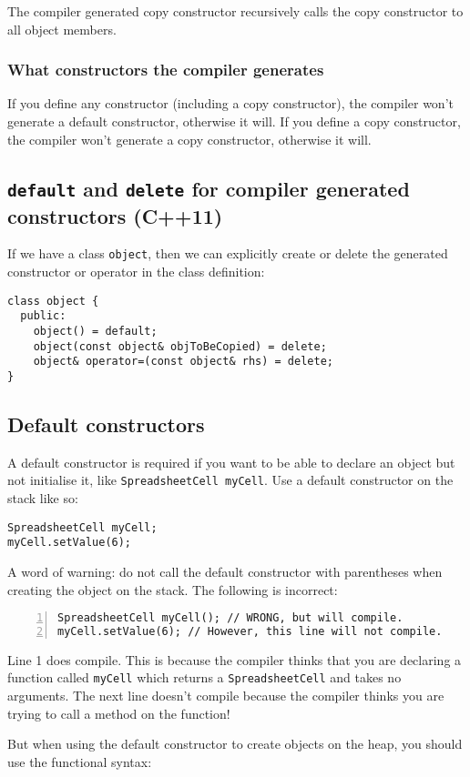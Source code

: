 \documentclass[a4paper,12pt,oneside]{book}
\begin{document}
The compiler generated copy constructor recursively calls the copy constructor to all object members.
\subsubsection{What constructors the compiler generates}
If you define any constructor (including a copy constructor), the compiler won't generate a default constructor, otherwise it will. If you define a copy constructor, the compiler won't generate a copy constructor, otherwise it will.
\subsection{\texttt{default} and \texttt{delete} for compiler generated constructors (C++11)}
If we have a class \lstinline|object|, then we can explicitly create or delete the generated constructor or operator in the class definition:

\begin{lstlisting}
class object {
  public:
    object() = default;
    object(const object& objToBeCopied) = delete;
    object& operator=(const object& rhs) = delete;
}
\end{lstlisting}

\subsection{Default constructors}
A default constructor is required if you want to be able to declare an object but not initialise it, like \lstinline|SpreadsheetCell myCell|. Use a default constructor on the stack like so:

\begin{lstlisting}
SpreadsheetCell myCell;
myCell.setValue(6);
\end{lstlisting}

A word of warning: do not call the default constructor with parentheses when creating the object on the stack. The following is incorrect:

\begin{lstlisting}[numbers=left]
SpreadsheetCell myCell(); // WRONG, but will compile.
myCell.setValue(6); // However, this line will not compile.
\end{lstlisting}

Line 1 does compile. This is because the compiler thinks that you are declaring a function called \lstinline|myCell| which returns a \lstinline|SpreadsheetCell| and takes no arguments. The next line doesn't compile because the compiler thinks you are trying to call a method on the function!
\vspace{\baselineskip}
\begin{center}
  \noindent{}
\end{center}
\vspace{\baselineskip}
But when using the default constructor to create objects on the heap, you should use the functional syntax:
\end{document}
